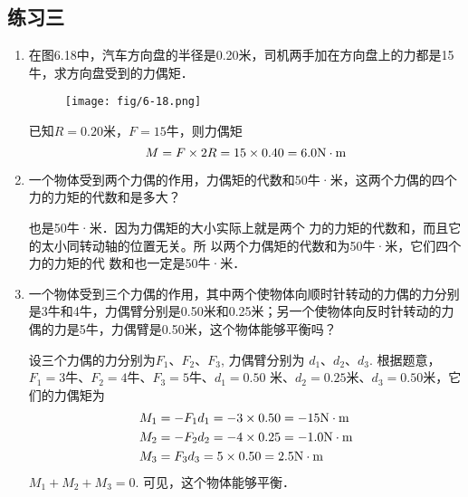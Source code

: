 \subsection{练习三}
\begin{enumerate}
    \item 在图6.18中，汽车方向盘的半径是0.20米，司机两手加在方向盘上的力都是15牛，求方向盘受到的力偶矩．
    \begin{figure}[htp]
        \centering    \texttt{[image: fig/6-18.png]}
        \caption{}
        \end{figure}

    \begin{solution}
        已知$R=0.20$米，$F=15$牛，则力偶矩
\[M=F\times2R=15\times 0.40=6.0{\rm N\cdot m}  \]
    \end{solution}
    \item 一个物体受到两个力偶的作用，力偶矩的代数和50牛·米，这两个力偶的四个力的力矩的代数和是多大？

   \begin{solution}
        也是50牛·米．因为力偶矩的大小实际上就是两个
        力的力矩的代数和，而且它的太小同转动轴的位置无关。所
        以两个力偶矩的代数和为50牛·米，它们四个力的力矩的代
        数和也一定是50牛·米． 
    \end{solution}
    \item 一个物体受到三个力偶的作用，其中两个使物体向顺时针转动的力偶的力分别是3牛和4牛，力偶臂分别是0.50米和0.25米；另一个使物体向反时针转动的力偶的力是5牛，力偶臂是0.50米，这个物体能够平衡吗？


    \begin{solution}
        设三个力偶的力分别为$F_1$、$F_2$、$F_3$, 力偶臂分别为
        $d_1$、$d_2$、$d_3$. 根据题意，$F_1=3$牛、$F_2=4$牛、$F_3=5$牛、$d_1=0.50$
        米、$d_2=0.25$米、$d_3=0.50$米，它们的力偶矩为
        \[\begin{split}
            M_1&=-F_1d_1=-3\times0.50=-15{\rm N\cdot m} \\
        M_2&=-F_2d_2=-4\times0.25=-1.0{\rm N\cdot m} \\
        M_3&=F_3d_3=5\times0.50=2.5{\rm N\cdot m}       
        \end{split}\]
        $M_1+M_2+M_3=0$. 可见，这个物体能够平衡．
    \end{solution}
\end{enumerate}




